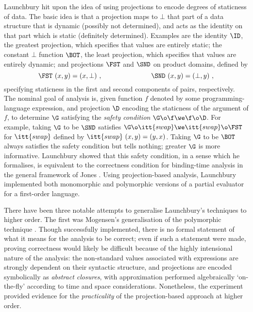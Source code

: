 \documentclass[11pt]{article}
\begin{document}
Launchbury \cite{Lau88} hit upon the idea
of using projections to encode degrees of staticness of data.  The
basic idea is that a projection maps to $\bot$ that part of a data
structure that is dynamic (possibly not determined), and acts as the
identity on that part which is static (definitely determined).
Examples are the identity $\ID$, the greatest projection, which
specifies that values are entirely static; the constant $\bot$
function $\BOT$, the least projection, which specifies that values are
entirely dynamic; and projections $\FST$ and $\SND$ on product
domains, defined by
\[
\FST\ (x,y) = (x,\bot)\ ,\hspace{1.0in} \SND\ (x,y) = (\bot,y)\ ,
\]
specifying staticness in the first and second components of pairs,
respectively.  The nominal goal of analysis is, given function $f$
denoted by some programming-language expression, and projection $\D$
encoding the staticness of the argument of $f$, to determine $\G$
satisfying the {\it safety condition\/} $\G\o\f\we\f\o\D$.  For
example, taking $\G$ to be $\SND$ satisfies
$\G\o\itt{swap}\we\itt{swap}\o\FST$ for $\itt{swap}$ defined by
$\itt{swap}~(x,y)=(y,x)$.  Taking $\G$ to be $\BOT$ always satisfies
the safety condition but tells nothing; greater $\G$ is more
informative.  Launchbury \cite{Lau91a} showed that this safety
condition, in a sense which he formalises, is equivalent
to the correctness condition for binding-time analysis in the general
framework of Jones \cite{Jon88}.  Using projection-based analysis,
Launchbury implemented both monomorphic and polymorphic versions of a
partial evaluator for a first-order language.

There have been three notable attempts to generalise Launchbury's
techniques to higher order.  The first was Mogensen's generalisation
of the polymorphic technique \cite{Mog89}.  Though successfully
implemented, there is no formal statement of what it means for the
analysis to be correct; even if such a statement were made, proving
correctness would likely be difficult because of the highly
intensional nature of the analysis: the non-standard values associated
with expressions are strongly dependent on their syntactic structure,
and projections are encoded symbolically as {\it abstract closures\/},
with approximation performed algebraically `on-the-fly' according to
time and space considerations.  Nonetheless, the experiment provided
evidence for the {\it practicality\/} of the projection-based approach
at higher order.
\end{document}
